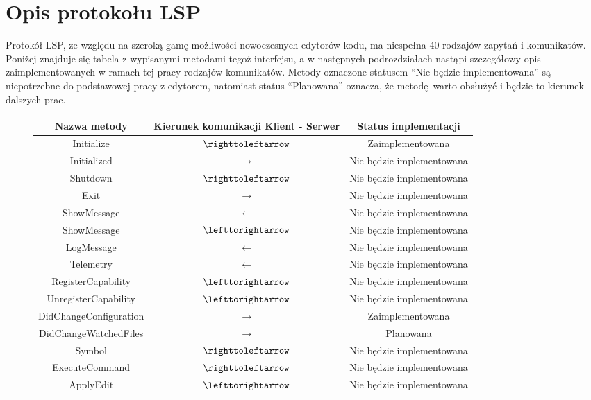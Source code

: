 \section{Opis protokołu LSP}
Protokół LSP, ze względu na szeroką gamę możliwości nowoczesnych edytorów kodu, ma niespełna 40 rodzajów zapytań i komunikatów. Poniżej znajduje się tabela z wypisanymi metodami tegoż interfejsu, a w następnych podrozdziałach nastąpi szczegółowy opis zaimplementowanych w ramach tej pracy rodzajów komunikatów. Metody oznaczone statusem “Nie będzie implementowana'' są niepotrzebne do podstawowej pracy z edytorem, natomiast status “Planowana'' oznacza, że metodę warto obsłużyć i będzie to kierunek dalszych prac.
\begin{figure}[H]
    \centering
    \footnotesize
\begin{tabular}{|c|c|c|}
\hline
Nazwa metody & Kierunek komunikacji Klient - Serwer & Status implementacji \\
\hline
Initialize & $\righttoleftarrow$ & Zaimplementowana \\   
\hline
Initialized & $\rightarrow$ & Nie będzie implementowana \\
\hline
Shutdown & $\righttoleftarrow$ & Nie będzie implementowana\\   
\hline
Exit & $\rightarrow$ & Nie będzie implementowana\\
\hline
ShowMessage & $\leftarrow$ & Nie będzie implementowana\\
\hline
ShowMessage & $\lefttorightarrow$ & Nie będzie implementowana\\
\hline
LogMessage & $\leftarrow$ & Nie będzie implementowana\\
\hline
Telemetry & $\leftarrow$ & Nie będzie implementowana\\
\hline
RegisterCapability & $\lefttorightarrow$ & Nie będzie implementowana\\
\hline
UnregisterCapability & $\lefttorightarrow$ & Nie będzie implementowana\\
\hline
DidChangeConfiguration & $\rightarrow$ &Zaimplementowana\\
\hline
DidChangeWatchedFiles & $\rightarrow$ &Planowana\\
\hline
Symbol & $\righttoleftarrow$ &Nie będzie implementowana\\
\hline
ExecuteCommand & $\righttoleftarrow$ & Nie będzie implementowana\\
\hline
ApplyEdit & $\lefttorightarrow$ & Nie będzie implementowana\\
\hline

\end{tabular}
\end{figure}
